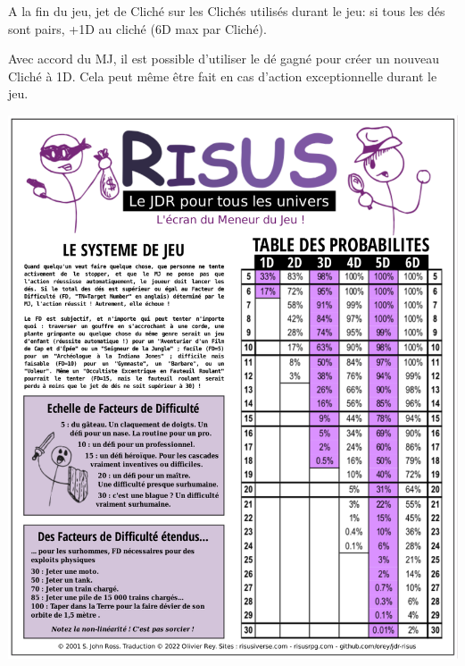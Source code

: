 \begin{frame}[t]
{%

A la fin du jeu, jet de Cliché sur les Clichés utilisés durant le jeu: si tous les dés sont pairs, +1D au cliché (6D max par Cliché).

Avec accord du MJ, il est possible d'utiliser le dé gagné pour créer un nouveau Cliché à 1D. Cela peut même être fait en cas d'action exceptionnelle durant le jeu.

}
\end{frame}


\begin{frame}[b]

\includegraphics[page=1]{Risus-GM-Screen-fr-OReyJdr09.pdf}

\vfill


\end{frame}
